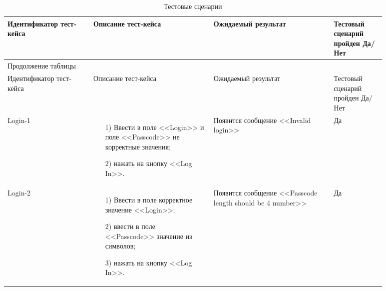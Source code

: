   \begin{longtable}{| >{\raggedright}p{0.20\linewidth} 
                  | >{\raggedright}p{0.28\linewidth} 
                  | >{\raggedright}p{0.28\linewidth} 
                  | >{\raggedright\arraybackslash}p{0.12\linewidth}|}
   \caption{Тестовые сценарии} \label{tab:long} \\

   \hline
   Идентификатор тест-кейса & Описание тест-кейса & Ожидаемый результат & Тестовый сценарий пройден Да/Нет \\
   \endfirsthead

\multicolumn{3}{l}%
{{\raggedright Продолжение таблицы \thetable{}}} \\
\hline
   Идентификатор тест-кейса & Описание тест-кейса & Ожидаемый результат & Тестовый сценарий пройден Да/Нет \\
\endhead
   \hline
   Login-1 &
   			\vspace{-6.5mm} 
   			\begin{enumerate} 
   				\item[1)] Ввести в поле <<Login>> и поле <<Passcode>> не корректные значения;
				\item[2)] нажать на кнопку <<Log In>>.
			\end{enumerate}
   			 & Появится сообщение <<Invalid login>> & Да \\

   \hline
   Login-2 & 
   			\vspace{-6.5mm}
   			\begin{enumerate} 
   				\item[1)] Ввести в поле корректное значение <<Login>>;
				\item[2)] ввести в поле <<Passcode>> значение из символов;
				\item[3)] нажать на кнопку <<Log In>>.
			\end{enumerate}
			& Появится сообщение <<Passcode length should be 4 number>> & Да \\


\end{longtable}
